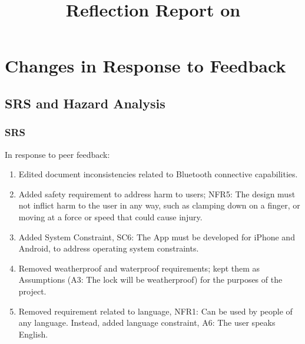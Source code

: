\documentclass{article}
\title{Reflection Report on \progname}
\author{\authname}
\date{}
\begin{document}
\maketitle

\newpage
\tableofcontents
\listoftables
\newpage


\section{Changes in Response to Feedback}



\subsection{SRS and Hazard Analysis}

\subsubsection{SRS}
In response to peer feedback:
\begin{enumerate}
    \item Edited document inconsistencies related to Bluetooth connective capabilities.
    \item Added safety requirement to address harm to users; NFR5: The design must not inflict harm to the user in any way, such as clamping down on a finger, or moving at a force or speed that could cause injury.
    \item Added System Constraint, SC6: The App must be developed for iPhone and Android, to address operating system constraints.
    \item Removed weatherproof and waterproof requirements; kept them as Assumptions (A3: The lock will be weatherproof) for the purposes of the project.
    \item Removed requirement related to language, NFR1: Can be used by people of any language. Instead, added language constraint, A6: The user speaks English.
\end{enumerate}
\end{document}
